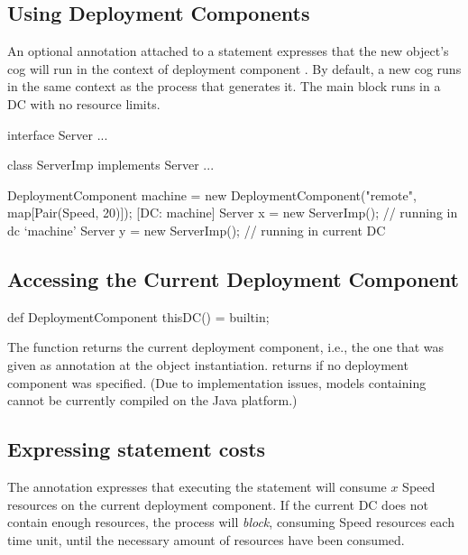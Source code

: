 \subsection{Using Deployment Components}

   An optional annotation \absinline{[DC: x]} attached to a 
   statement expresses that the new object's cog will run in the context
   of deployment component .  By default, a new cog runs in the
   same context as the process that generates it.  The main block runs
   in a DC with no resource limits.

\begin{absexample} 
interface Server { ... }

class ServerImp implements Server { ... }

{
  DeploymentComponent machine = new DeploymentComponent("remote",
      map[Pair(Speed, 20)]);
  [DC: machine] Server x = new ServerImp();  // running in dc `machine'
  Server y = new ServerImp();                // running in current DC
}
\end{absexample} 

\subsection{Accessing the Current Deployment Component}

\begin{absexample} 
def DeploymentComponent thisDC() = builtin;
\end{absexample} 

   The  function returns the current deployment
   component, i.e., the one that was given as annotation at the 
   object instantiation.   returns  if no
   deployment component was specified.  (Due to implementation issues,
   models containing  cannot be currently compiled on the
   Java platform.)

\subsection{Expressing statement costs}

The annotation  expresses that executing the statement
 will consume $x$ Speed resources on the current deployment
component.  If the current DC does not contain enough resources, the process
will \emph{block}, consuming Speed resources each time unit, until the necessary
amount of resources have been consumed.

